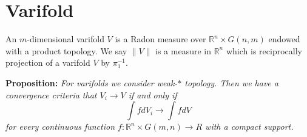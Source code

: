 \documentclass{article}
\begin{document}
\section{Varifold}

An $m$-dimensional varifold $V$ is a Radon measure over $\mathbb{R}^n\times
G(n,m)$ endowed with a product topology. We say $\|V\|$ is a measure in
$\mathbb{R}^n$ which is reciprocally projection of a varifold $V$ by $\pi_1^{-1}$.

\vspace{2ex}
\textbf{Proposition:} \textit{For varifolds we consider weak-$*$ topology. Then we have a
convergence criteria that $V_i\rightarrow V$ if and only if
\[\int fdV_i\rightarrow\int fdV\]
for every continuous function $f:\mathbb{R}^n\times G(m,n)\rightarrow R$ with a
compact support.}
\vspace{1ex}

\medskip


\end{document}
